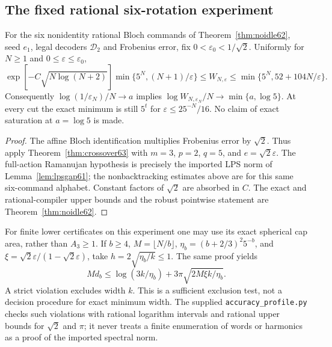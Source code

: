 \subsection{The fixed rational six-rotation experiment}
\begin{corollary}\label{cor:lpscrossover63}
For the six nonidentity rational Bloch commands of
Theorem~\ref{thm:noidle62}, seed $e_1$, legal decoders $\mathcal D_2$
and Frobenius error, fix $0<\varepsilon_0<1/\sqrt2$. Uniformly for
$N\ge1$ and $0\le\varepsilon\le\varepsilon_0$,
\begin{equation}\label{eq:lpscrossover63}
 \exp[-C\sqrt{N\log(N+2)}]\min\{5^N,(N+1)/\varepsilon\}
 \le W_{N,\varepsilon}
 \le\min\{5^N,52+104N/\varepsilon\}.
\end{equation}
Consequently $\log(1/\varepsilon_N)/N\to a$ implies
$\log W_{N,\varepsilon_N}/N\to\min\{a,\log5\}$.
At every cut the exact minimum is still $5^t$ for
$\varepsilon\le25^{-N}/16$. No claim of exact saturation at
$a=\log5$ is made.
\end{corollary}
\begin{proof}
The affine Bloch identification multiplies Frobenius error by
$\sqrt2$. Thus apply Theorem~\ref{thm:crossover63} with $m=3$,
$p=2$, $q=5$, and $e=\sqrt2\varepsilon$.
The full-action Ramanujan hypothesis is precisely the imported LPS
norm of Lemma~\ref{lem:lpsgap61}; the nonbacktracking estimates above
are for this same six-command alphabet. Constant factors of $\sqrt2$
are absorbed in $C$. The exact and rational-compiler upper bounds and
the robust pointwise statement are Theorem~\ref{thm:noidle62}.
\end{proof}

For finite lower certificates on this experiment one may use its exact
spherical cap area, rather than $A_3\ge1$. If $b\ge4$,
$M=\lfloor N/b\rfloor$, $\eta_b=(b+2/3)^2 5^{-b}$, and
$\xi=\sqrt2\varepsilon/(1-\sqrt2\varepsilon)$, take
$h=2\sqrt{\eta_b/k}\le1$. The same proof yields
\begin{equation}\label{eq:lpscertificate63}
 M d_b\le\log(3k/\eta_b)
                 +3\pi\sqrt{2M\xi k/\eta_b}.
\end{equation}
A strict violation excludes width $k$. This is a sufficient exclusion
test, not a decision procedure for exact minimum width. The supplied
\texttt{accuracy\_profile.py} checks such violations with rational
logarithm intervals and rational upper bounds for $\sqrt2$ and $\pi$;
it never treats a finite enumeration of words or harmonics as a proof
of the imported spectral norm.
